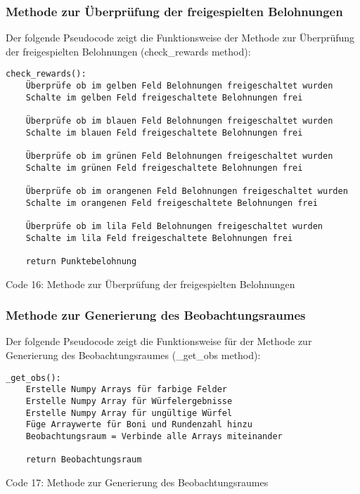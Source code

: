 \subsubsection{Methode zur Überprüfung der freigespielten Belohnungen}
\begin{minipage}{\linewidth}
Der folgende Pseudocode zeigt die Funktionsweise der Methode zur Überprüfung der freigespielten Belohnungen (check\_rewards method):
\vspace{0.5cm}
\begin{lstlisting}
check_rewards():
	Überprüfe ob im gelben Feld Belohnungen freigeschaltet wurden
	Schalte im gelben Feld freigeschaltete Belohnungen frei
	
	Überprüfe ob im blauen Feld Belohnungen freigeschaltet wurden
	Schalte im blauen Feld freigeschaltete Belohnungen frei
	
	Überprüfe ob im grünen Feld Belohnungen freigeschaltet wurden
	Schalte im grünen Feld freigeschaltete Belohnungen frei
	
	Überprüfe ob im orangenen Feld Belohnungen freigeschaltet wurden
	Schalte im orangenen Feld freigeschaltete Belohnungen frei
	
	Überprüfe ob im lila Feld Belohnungen freigeschaltet wurden
	Schalte im lila Feld freigeschaltete Belohnungen frei
	
	return Punktebelohnung
\end{lstlisting}
Code 16: Methode zur Überprüfung der freigespielten Belohnungen\\
\end{minipage}

\subsubsection{Methode zur Generierung des Beobachtungsraumes}
\begin{minipage}{\linewidth}
Der folgende Pseudocode zeigt die Funktionsweise für der Methode zur Generierung des Beobachtungsraumes (\_get\_obs method):
\vspace{0.5cm}
\begin{lstlisting}
_get_obs():
	Erstelle Numpy Arrays für farbige Felder
	Erstelle Numpy Array für Würfelergebnisse
	Erstelle Numpy Array für ungültige Würfel
	Füge Arraywerte für Boni und Rundenzahl hinzu
	Beobachtungsraum = Verbinde alle Arrays miteinander
	
	return Beobachtungsraum
\end{lstlisting}
Code 17: Methode zur Generierung des Beobachtungsraumes\\
\end{minipage}

